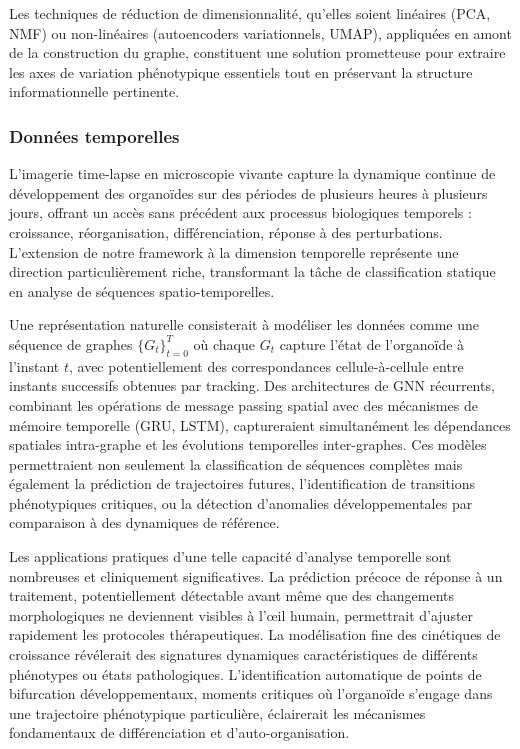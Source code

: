Les techniques de réduction de dimensionnalité, qu'elles soient linéaires (PCA, NMF) ou non-linéaires (autoencoders variationnels, UMAP), appliquées en amont de la construction du graphe, constituent une solution prometteuse pour extraire les axes de variation phénotypique essentiels tout en préservant la structure informationnelle pertinente.

\subsubsection{Données temporelles}

L'imagerie time-lapse en microscopie vivante capture la dynamique continue de développement des organoïdes sur des périodes de plusieurs heures à plusieurs jours, offrant un accès sans précédent aux processus biologiques temporels : croissance, réorganisation, différenciation, réponse à des perturbations. L'extension de notre framework à la dimension temporelle représente une direction particulièrement riche, transformant la tâche de classification statique en analyse de séquences spatio-temporelles.

Une représentation naturelle consisterait à modéliser les données comme une séquence de graphes $\{G_t\}_{t=0}^T$ où chaque $G_t$ capture l'état de l'organoïde à l'instant $t$, avec potentiellement des correspondances cellule-à-cellule entre instants successifs obtenues par tracking. Des architectures de GNN récurrents, combinant les opérations de message passing spatial avec des mécanismes de mémoire temporelle (GRU, LSTM), captureraient simultanément les dépendances spatiales intra-graphe et les évolutions temporelles inter-graphes. Ces modèles permettraient non seulement la classification de séquences complètes mais également la prédiction de trajectoires futures, l'identification de transitions phénotypiques critiques, ou la détection d'anomalies développementales par comparaison à des dynamiques de référence.

Les applications pratiques d'une telle capacité d'analyse temporelle sont nombreuses et cliniquement significatives. La prédiction précoce de réponse à un traitement, potentiellement détectable avant même que des changements morphologiques ne deviennent visibles à l'œil humain, permettrait d'ajuster rapidement les protocoles thérapeutiques. La modélisation fine des cinétiques de croissance révélerait des signatures dynamiques caractéristiques de différents phénotypes ou états pathologiques. L'identification automatique de points de bifurcation développementaux, moments critiques où l'organoïde s'engage dans une trajectoire phénotypique particulière, éclairerait les mécanismes fondamentaux de différenciation et d'auto-organisation.


